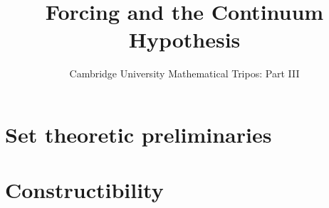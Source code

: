 \documentclass{article}
\title{Forcing and the Continuum Hypothesis}
\author{Cambridge University Mathematical Tripos: Part III}
\begin{document}
\maketitle

\tableofcontentsnewpage{}

\section{Set theoretic preliminaries}

\section{Constructibility}

\end{document}
